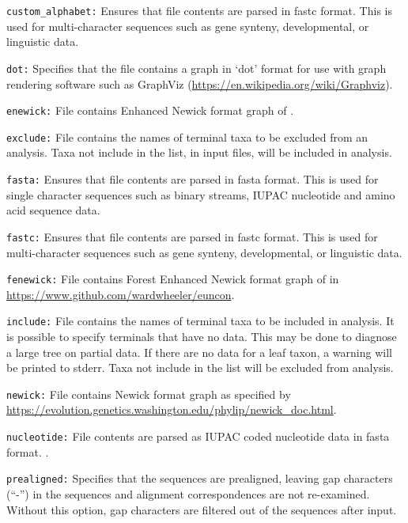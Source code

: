\documentclass[11pt]{article}
\begin{document}
			\smallskip		
			\noindent \texttt{custom\_alphabet:} Ensures that file contents are parsed in fastc \citep{WheelerandWashburn2019} format. This is used for multi-character sequences such as gene synteny, developmental,  or linguistic  data.
			
			\smallskip		
			\noindent \texttt{dot:} Specifies that the file contains a graph in `dot' format for use with graph rendering software such as GraphViz (\url{https://en.wikipedia.org/wiki/Graphviz}).
			
			\smallskip		
			\noindent \texttt{enewick:} File contains Enhanced Newick format graph of \cite{Cardonaetal2008}.
			
			\smallskip		
			\noindent \texttt{exclude:}  File contains the names of terminal taxa to be excluded from an analysis.  Taxa not include in the list, in input files, will be included in analysis. 
			
			\smallskip		
			\noindent \texttt{fasta:} Ensures that file contents are parsed in fasta \citep{PearsonandLipman1988} format. This is used for single character sequences such as binary streams, IUPAC nucleotide and amino acid sequence data.
			
			\smallskip		
			\noindent \texttt{fastc:} Ensures that file contents are parsed in fastc \citep{WheelerandWashburn2019} format. This is used for multi-character sequences such as gene synteny, developmental,  or linguistic  data.
			
			\smallskip		
			\noindent \texttt{fenewick:}  File contains Forest Enhanced Newick format graph of \cite{Wheeler2021a} in \url{https://www.github.com/wardwheeler/euncon}.
			
			\smallskip		
			\noindent \texttt{include:}  File contains the names of terminal taxa to be included in analysis.  It is possible to specify terminals that have no data.  This may be done to diagnose a large tree on partial data.  If there are no data for a leaf taxon, a warning will be printed to stderr.  Taxa not include in the list will be excluded from analysis. 
			
			\smallskip		
			\noindent \texttt{newick:} File contains  Newick format graph as specified by \url{https://evolution.genetics.washington.edu/phylip/newick_doc.html}.
			
			\smallskip		
			\noindent \texttt{nucleotide:} File contents are parsed as IUPAC coded nucleotide data in fasta \citep{PearsonandLipman1988} format. .
			
			\smallskip		
			\noindent \texttt{prealigned:} Specifies that the sequences are prealigned, leaving gap characters
			(``-'') in the sequences and alignment correspondences are not re-examined. Without this option,
			gap characters are filtered out of the sequences after input.
			
\end{document}
